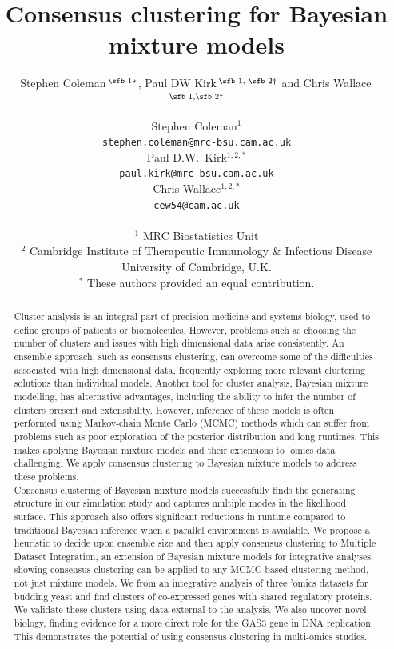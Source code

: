 \documentclass{article}
\title{Consensus clustering for Bayesian mixture models}
\author{Stephen Coleman\,$^{\text{\sfb 1}*}$, Paul DW Kirk\,$^{\text{\sfb 1, \sfb 2}\dagger}$ and Chris Wallace\,$^{\text{\sfb 1,\sfb 2}\dagger}$}
\author{
	Stephen Coleman$^1$ \\
	\texttt{stephen.coleman@mrc-bsu.cam.ac.uk} \\
	\And
	Paul D.W.~Kirk$^{1,2, *}$ \\
	\texttt{paul.kirk@mrc-bsu.cam.ac.uk} \\
	\AND
	Chris Wallace$^{1,2, *}$ \\
	\texttt{cew54@cam.ac.uk} \\ 
	\vspace{1cm} \\
	$^1$ MRC Biostatistics Unit\\
	$^2$ Cambridge Institute of Therapeutic Immunology \& Infectious Disease \\
	University of Cambridge, U.K. \\
	$^*$ These authors provided an equal contribution.
}
\begin{document}
	
	\maketitle
	
	\begin{abstract}
		Cluster analysis is an integral part of precision medicine and systems biology, used to define groups of patients or biomolecules. However, problems such as choosing the number of clusters and issues with high dimensional data arise consistently. An ensemble approach, such as consensus clustering, can overcome some of the difficulties associated with high dimensional data, frequently exploring more relevant clustering solutions than individual models. Another tool for cluster analysis, Bayesian mixture modelling, has alternative advantages, including the ability to infer the number of clusters present and extensibility. 
		However, inference of these models is often performed using Markov-chain Monte Carlo (MCMC) methods which can suffer from problems such as poor exploration of the posterior distribution and long runtimes.
		This makes applying Bayesian mixture models and their extensions to 'omics data challenging. We apply
		consensus clustering to Bayesian mixture models to address these problems. 
		\\
		Consensus clustering of Bayesian mixture models successfully finds the generating structure in our simulation study and captures multiple modes in the likelihood surface. This approach also offers significant reductions in runtime compared to traditional Bayesian inference when a parallel environment is available. We propose a heuristic to decide upon ensemble size and then apply consensus clustering to Multiple Dataset Integration, an extension of Bayesian mixture models for integrative analyses, showing consensus clustering can be applied to any MCMC-based clustering method, not just mixture models. We from an integrative analysis of three 'omics datasets for budding yeast and find clusters of co-expressed genes with shared regulatory proteins. We validate these clusters using data external to the analysis. We also uncover novel biology, finding evidence for a more direct role for the GAS3 gene in DNA replication. This demonstrates the potential of using consensus clustering in multi-omics studies.

\end{abstract}
\end{document}
